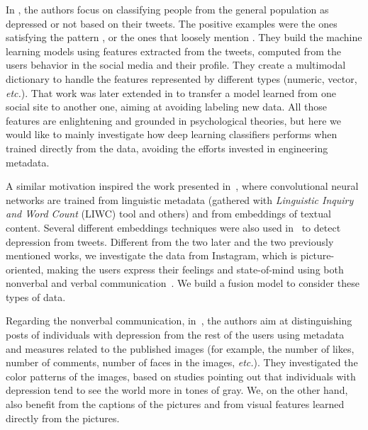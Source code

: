 \documentclass[letterpaper]{article} \usepackage{aaai20}  \usepackage{times}  \usepackage{helvet} \usepackage{courier}  \usepackage[hyphens]{url}  \usepackage{graphicx} \urlstyle{rm} \def\UrlFont{\rm}  \usepackage{graphicx}  \frenchspacing  \setlength{\pdfpagewidth}{8.5in}  \setlength{\pdfpageheight}{11in}  \usepackage[final]{changes}
\begin{document}
In \cite{shen2017depression}, the authors focus on classifying people from the general population as depressed or not based on their tweets. The positive examples were the ones satisfying the pattern , or the ones that loosely mention . They build the machine learning models using features extracted from the tweets, computed from the users behavior in the social media and their profile. They create a multimodal dictionary to handle the features represented by different types (numeric, vector, \textit{etc.}). That work was later extended in \cite{shen18depression} to transfer a model learned from one social site to another one, aiming at avoiding labeling new data. All those features are enlightening and grounded in psychological theories, but here we would like to mainly investigate how deep learning classifiers performs when trained directly from the data, avoiding the efforts invested in engineering metadata.

A similar motivation inspired the work presented in~\cite{trotzek2018utilizing}, where convolutional neural networks are trained from linguistic metadata (gathered with \textit{Linguistic Inquiry and Word Count} (LIWC) tool and others) and from embeddings of textual content. Several different embeddings techniques were also used in~\cite{orabi2018deep} to detect depression from tweets. Different from the two later and the two previously mentioned works, we investigate the data from Instagram, which is picture-oriented, making the users express their feelings and state-of-mind using both nonverbal and verbal communication~\cite{morales-etal-2017-cross}. We build a fusion model to consider these types of data.

Regarding the nonverbal communication, in~\cite{reece2017instagram}, the authors aim at distinguishing posts of individuals with depression from the rest of the users using metadata and measures related to the published images (for example, the number of likes, number of comments, number of faces in the images, \textit{etc.}). They investigated the color patterns of the images, based on studies pointing out that individuals with depression tend to see the world more in tones of gray. We, on the other hand, also benefit from the captions of the pictures and from visual features learned directly from the pictures.
\end{document}
